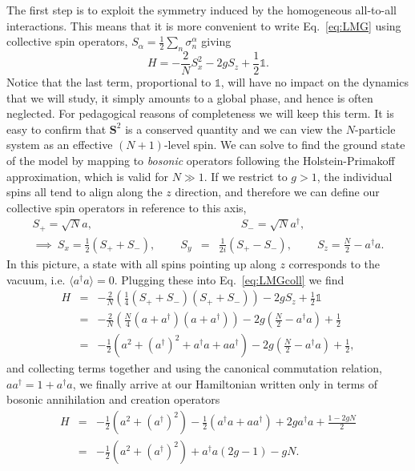 The first step is to exploit the symmetry induced by the homogeneous all-to-all interactions. This means that it is more convenient to write Eq.~\eqref{eq:LMG} using collective spin operators, $S_\alpha = \tfrac{1}{2}\sum_n \sigma^\alpha_n$ giving
\begin{equation}
\label{eq:LMGcoll}
H= -\frac{2}{N} S_x^2 -2g S_z + \frac{1}{2}\mathds{1}.
\end{equation}
Notice that the last term, proportional to $\mathds{1}$, will have no impact on the dynamics that we will study, it simply amounts to a global phase, and hence is often neglected. For pedagogical reasons of completeness we will keep this term. It is easy to confirm that $\mathbf{S}^2$ is a conserved quantity and we can view the $N$-particle system as an effective $(N\!+\!1)$-level spin. 
We can solve to find the ground state of the model by mapping to {\it bosonic} operators following the Holstein-Primakoff approximation, which is valid for $N\!\gg\! 1$. If we restrict to $g\!>\! 1$, the individual spins all tend to align along the $z$ direction, and therefore we can define our collective spin operators in reference to this axis,
\begin{eqnarray}
\label{eq:HPapprox}
S_+ = \sqrt{N} a,&&\qquad S_-=\sqrt{N}a^{\dagger},\nonumber\\ 
\implies~S_x=\frac{1}{2}(S_+ + S_-),~\qquad S_y&=&\frac{1}{2i}(S_+ - S_-),~\qquad S_z=\frac{N}{2}-a^\dagger a.
\end{eqnarray}
In this picture, a state with all spins pointing up along $z$ corresponds to the vacuum, i.e. $\langle a^\dagger a \rangle=0$. Plugging these into Eq.~\eqref{eq:LMGcoll} we find
\begin{eqnarray}
H&=& -\frac{2}{N} \left( \frac{1}{4}(S_+ + S_-)(S_+ + S_-) \right) - 2 g S_z + \frac{1}{2}\mathds{1} \nonumber \\
&=& -\frac{2}{N} \left( \frac{N}{4}(a + a^\dagger)(a + a^\dagger) \right) - 2 g \left(\frac{N}{2} - a^{\dagger}a\right) + \frac{1}{2} \\
&=& -\frac{1}{2} \left( a^2 + (a^\dagger)^2 + a^\dagger a + a a^\dagger \right) - 2g \left(\frac{N}{2} - a^\dagger a \right) + \frac{1}{2},  \nonumber
\end{eqnarray}
and collecting terms together and using the canonical commutation relation, $a a^\dagger = 1+a^\dagger a$, we finally arrive at our Hamiltonian written only in terms of bosonic annihilation and creation operators
\begin{eqnarray}
H&=& -\frac{1}{2} \left(a^2 + (a^\dagger)^2 \right) - \frac{1}{2}\left( a^\dagger a + a a^\dagger \right) + 2 g a^\dagger a + \frac{1-2g N}{2} \nonumber \\
&=& -\frac{1}{2}\left(a^2 + (a^\dagger)^2 \right) + a^\dagger a \left( 2 g -1 \right) - g N. \label{eq:LMGmapped}
\end{eqnarray}

